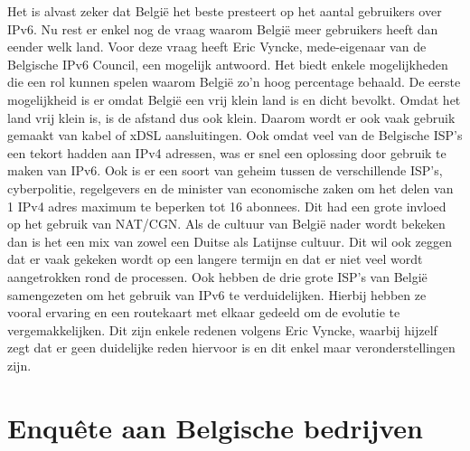 Het is alvast zeker dat België het beste presteert op het aantal gebruikers over IPv6. Nu rest er enkel nog de vraag waarom België meer gebruikers heeft dan eender welk land. Voor deze vraag heeft Eric Vyncke, mede-eigenaar van de Belgische IPv6 Council, een mogelijk antwoord. Het biedt enkele mogelijkheden die een rol kunnen spelen waarom België zo’n hoog percentage behaald. De eerste mogelijkheid is er omdat België een vrij klein land is en dicht bevolkt. Omdat het land vrij klein is, is de afstand dus ook klein. Daarom wordt er ook vaak gebruik gemaakt van kabel of xDSL aansluitingen. Ook omdat veel van de Belgische ISP’s een tekort hadden aan IPv4 adressen, was er snel een oplossing door gebruik te maken van IPv6. Ook is er een soort van geheim tussen de verschillende ISP’s, cyberpolitie, regelgevers en de minister van economische zaken om het delen van 1 IPv4 adres maximum te beperken tot 16 abonnees. Dit had een grote invloed op het gebruik van NAT/CGN. Als de cultuur van België nader wordt bekeken dan is het een mix van zowel een Duitse als Latijnse cultuur. Dit wil ook zeggen dat er vaak gekeken wordt op een langere termijn en dat er niet veel wordt aangetrokken rond de processen. Ook hebben de drie grote ISP’s van België samengezeten om het gebruik van IPv6 te verduidelijken. Hierbij hebben ze vooral ervaring en een routekaart  met elkaar gedeeld om de evolutie te vergemakkelijken. Dit zijn enkele redenen volgens Eric Vyncke, waarbij hijzelf zegt dat er geen duidelijke reden hiervoor is en dit enkel maar veronderstellingen zijn.

\section{Enquête aan Belgische bedrijven}

